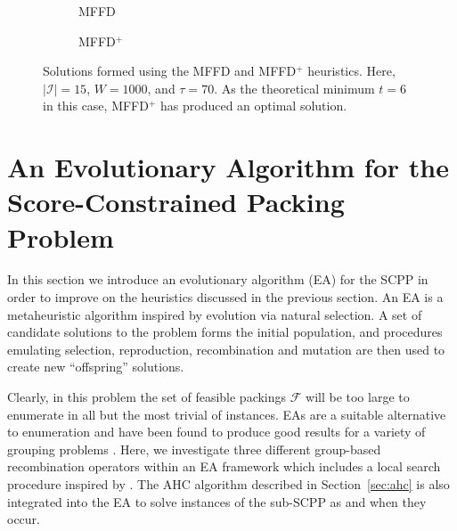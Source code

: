 \documentclass[a4paper,11pt,authoryear]{elsarticle}
\begin{document}
\begin{figure}[h]	
	\centering
	\begin{subfigure}[h]{0.33\textwidth}
		
		\caption{MFFD}
		\label{fig:mffd}
	\end{subfigure} \hspace{15mm}
	\begin{subfigure}[h]{0.33\textwidth}
		
		\caption{MFFD$^+$}
		\label{fig:mffdplus}
	\end{subfigure}
	\caption{Solutions formed using the MFFD and MFFD$^+$ heuristics. Here, $|\mathcal{I}| = 15$, $W = 1000$, and $\tau = 70$. As the theoretical minimum $t=6$ in this case, MFFD$^+$ has produced an optimal solution.}
	\label{fig:mffdvsmffdplus}
\end{figure}

\section{An Evolutionary Algorithm for the Score-Constrained Packing Problem}
\label{sec:ea}

\noindent In this section we introduce an evolutionary algorithm (EA) for the SCPP in order to improve on the heuristics discussed in the previous section. An EA is a metaheuristic algorithm inspired by evolution via natural selection. A set of candidate solutions to the problem forms the initial population, and procedures emulating selection, reproduction, recombination and mutation are then used to create new ``offspring'' solutions. 

Clearly, in this problem the set of feasible packings $\mathcal{F}$ will be too large to enumerate in all but the most trivial of instances. EAs are a suitable alternative to enumeration and have been found to produce good results for a variety of grouping problems \citep{lewis2017, falkenauer1996, quiroz2015}. Here, we investigate three different group-based recombination operators within an EA framework which includes a local search procedure inspired by \cite{martello1990l}. The AHC algorithm described in Section~\ref{sec:ahc} is also integrated into the EA to solve instances of the sub-SCPP as and when they occur.
\end{document}
